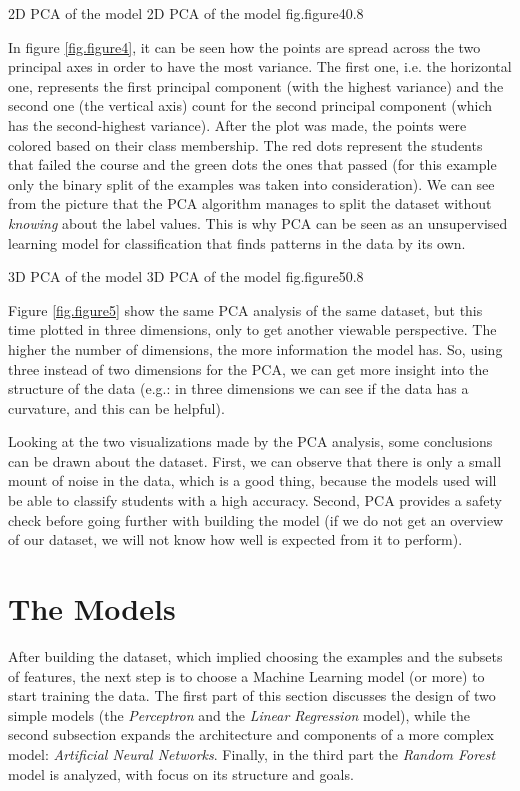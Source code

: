 %
    {2D PCA of the model}%
    {2D PCA of the model}%
    {fig.figure4}{0.8}

In figure \ref{fig.figure4}, it can be seen how the points are spread across 
the two principal axes in order to have the most variance. The first one, i.e. 
the horizontal one, represents the first principal component (with the highest 
variance) and the second one (the vertical axis) count for the second principal 
component (which has the second-highest variance). After the plot was made, 
the points were colored based on their class membership. The red dots represent 
the students that failed the course and the green dots the ones that passed 
(for this example only the binary split of the examples was taken into consideration). 
We can see from the picture that the PCA algorithm manages to split the dataset 
without {\it knowing} about the label values. This is why PCA can be seen as 
an unsupervised learning model for classification that finds patterns in the data 
by its own. 

%
    {3D PCA of the model}%
    {3D PCA of the model}%
    {fig.figure5}{0.8}

Figure \ref{fig.figure5} show the same PCA analysis of the same dataset, but 
this time plotted in three dimensions, only to get another viewable perspective.
The higher the number of dimensions, the more information the model has. So, 
using three instead of two dimensions for the PCA, we can get more insight into 
the structure of the data (e.g.: in three dimensions we can see if the data has 
a curvature, and this can be helpful).

Looking at the two visualizations made by the PCA analysis, some conclusions can 
be drawn about the dataset. First, we can observe that there is only a small 
mount of noise in the data, which is a good thing, because the models used will 
be able to classify students with a high accuracy. Second, PCA provides a 
safety check before going further with building the model (if we do not get an 
overview of our dataset, we will not know how well is expected from it to perform).

\section{The Models}

After building the dataset, which implied choosing the examples and the subsets 
of features, the next step is to choose a Machine Learning model (or more) to 
start training the data. The first part of this section discusses the design of 
two simple models (the {\it Perceptron} and the {\it Linear Regression} model), 
while the second subsection expands the architecture and components of a more 
complex model: {\it Artificial Neural Networks}. Finally, in the third part 
the {\it Random Forest} model is analyzed, with focus on its structure and goals. 


